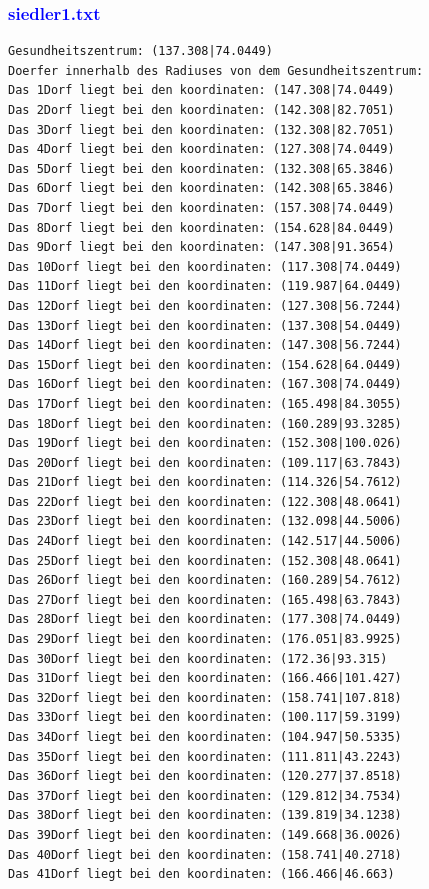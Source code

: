 \documentclass{article}
\begin{document}
\subsubsection{\textcolor{blue}{siedler1.txt}}
\begin{verbatim}
Gesundheitszentrum: (137.308|74.0449)
Doerfer innerhalb des Radiuses von dem Gesundheitszentrum: 
Das 1Dorf liegt bei den koordinaten: (147.308|74.0449)
Das 2Dorf liegt bei den koordinaten: (142.308|82.7051)
Das 3Dorf liegt bei den koordinaten: (132.308|82.7051)
Das 4Dorf liegt bei den koordinaten: (127.308|74.0449)
Das 5Dorf liegt bei den koordinaten: (132.308|65.3846)
Das 6Dorf liegt bei den koordinaten: (142.308|65.3846)
Das 7Dorf liegt bei den koordinaten: (157.308|74.0449)
Das 8Dorf liegt bei den koordinaten: (154.628|84.0449)
Das 9Dorf liegt bei den koordinaten: (147.308|91.3654)
Das 10Dorf liegt bei den koordinaten: (117.308|74.0449)
Das 11Dorf liegt bei den koordinaten: (119.987|64.0449)
Das 12Dorf liegt bei den koordinaten: (127.308|56.7244)
Das 13Dorf liegt bei den koordinaten: (137.308|54.0449)
Das 14Dorf liegt bei den koordinaten: (147.308|56.7244)
Das 15Dorf liegt bei den koordinaten: (154.628|64.0449)
Das 16Dorf liegt bei den koordinaten: (167.308|74.0449)
Das 17Dorf liegt bei den koordinaten: (165.498|84.3055)
Das 18Dorf liegt bei den koordinaten: (160.289|93.3285)
Das 19Dorf liegt bei den koordinaten: (152.308|100.026)
Das 20Dorf liegt bei den koordinaten: (109.117|63.7843)
Das 21Dorf liegt bei den koordinaten: (114.326|54.7612)
Das 22Dorf liegt bei den koordinaten: (122.308|48.0641)
Das 23Dorf liegt bei den koordinaten: (132.098|44.5006)
Das 24Dorf liegt bei den koordinaten: (142.517|44.5006)
Das 25Dorf liegt bei den koordinaten: (152.308|48.0641)
Das 26Dorf liegt bei den koordinaten: (160.289|54.7612)
Das 27Dorf liegt bei den koordinaten: (165.498|63.7843)
Das 28Dorf liegt bei den koordinaten: (177.308|74.0449)
Das 29Dorf liegt bei den koordinaten: (176.051|83.9925)
Das 30Dorf liegt bei den koordinaten: (172.36|93.315)
Das 31Dorf liegt bei den koordinaten: (166.466|101.427)
Das 32Dorf liegt bei den koordinaten: (158.741|107.818)
Das 33Dorf liegt bei den koordinaten: (100.117|59.3199)
Das 34Dorf liegt bei den koordinaten: (104.947|50.5335)
Das 35Dorf liegt bei den koordinaten: (111.811|43.2243)
Das 36Dorf liegt bei den koordinaten: (120.277|37.8518)
Das 37Dorf liegt bei den koordinaten: (129.812|34.7534)
Das 38Dorf liegt bei den koordinaten: (139.819|34.1238)
Das 39Dorf liegt bei den koordinaten: (149.668|36.0026)
Das 40Dorf liegt bei den koordinaten: (158.741|40.2718)
Das 41Dorf liegt bei den koordinaten: (166.466|46.663)

\end{verbatim}
\end{document}
